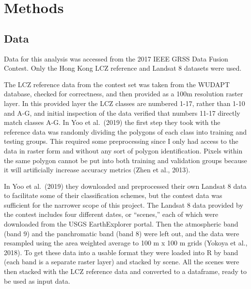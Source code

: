 \documentclass[
]{article}
\begin{document}
\hypertarget{methods}{%
\section{Methods}\label{methods}}

\hypertarget{data}{%
\subsection{Data}\label{data}}

Data for this analysis was accessed from the 2017 IEEE GRSS Data Fusion
Contest. Only the Hong Kong LCZ reference and Landsat 8 datasets were
used.

The LCZ reference data from the contest set was taken from the WUDAPT
database, checked for correctness, and then provided as a 100m
resolution raster layer. In this provided layer the LCZ classes are
numbered 1-17, rather than 1-10 and A-G, and initial inspection of the
data verified that numbers 11-17 directly match classes A-G. In Yoo et
al.~(2019) the first step they took with the reference data was randomly
dividing the polygons of each class into training and testing groups.
This required some preprocessing since I only had access to the data in
raster form and without any sort of polygon identification. Pixels
within the same polygon cannot be put into both training and validation
groups because it will artificially increase accuracy metrics (Zhen et
al., 2013).

In Yoo et al.~(2019) they downloaded and preprocessed their own Landsat
8 data to facilitate some of their classification schemes, but the
contest data was sufficient for the narrower scope of this project. The
Landsat 8 data provided by the contest includes four different dates, or
``scenes,'' each of which were downloaded from the USGS EarthExplorer
portal. Then the atmospheric band (band 9) and the panchromatic band
(band 8) were left out, and the data were resampled using the area
weighted average to 100 m x 100 m grids (Yokoya et al., 2018). To get
these data into a usable format they were loaded into R by band (each
band is a separate raster layer) and stacked by scene. All the scenes
were then stacked with the LCZ reference data and converted to a
dataframe, ready to be used as input data.
\end{document}
